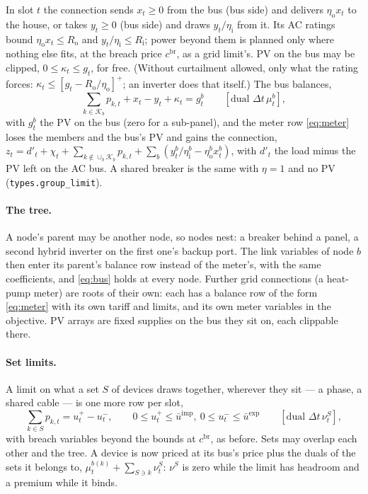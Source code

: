 \documentclass[11pt,a4paper]{article}
\newcommand{\dt}{\Delta t}
\newcommand{\cbr}{c^{\mathrm{br}}}
\begin{document}
In slot $t$ the connection sends $x_t \ge 0$ from the bus (bus side) and
delivers $\eta_{\mathrm o} x_t$ to the house, or takes $y_t \ge 0$ (bus side)
and draws $y_t/\eta_{\mathrm i}$ from it. Its AC ratings bound
$\eta_{\mathrm o} x_t \le R_{\mathrm o}$ and $y_t/\eta_{\mathrm i} \le R_{\mathrm i}$;
power beyond them is planned only where nothing else fits, at the breach price
$\cbr$, as a grid limit's. PV on the bus may be clipped, $0 \le \kappa_t \le g_t$,
for free. (Without curtailment allowed, only what the rating forces:
$\kappa_t \le [g_t - R_{\mathrm o}/\eta_{\mathrm o}]^+$; an inverter does that
itself.) The bus balances,
\begin{equation}
  \textstyle\sum_{k \in \mathcal K_b} p_{k,t} + x_t - y_t + \kappa_t = g^b_t
  \qquad [\text{dual } \dt\,\mu^b_t],
  \label{eq:bus}
\end{equation}
with $g^b_t$ the PV on the bus (zero for a sub-panel), and the meter row
\eqref{eq:meter} loses the members and the bus's PV and gains the connection,
$z_t = d'_t + \chi_t + \sum_{k \notin \cup_b \mathcal K_b} p_{k,t}
+ \sum_b (y^b_t/\eta^b_{\mathrm i} - \eta^b_{\mathrm o} x^b_t)$, with $d'_t$ the
load minus the PV left on the AC bus. A shared breaker is the same with
$\eta = 1$ and no PV (\texttt{types.group\_limit}).

\paragraph{The tree.} A node's parent may be another node, so nodes nest: a
breaker behind a panel, a second hybrid inverter on the first one's backup
port. The link variables of node $b$ then enter its parent's balance row
instead of the meter's, with the same coefficients, and \eqref{eq:bus} holds at
every node. Further grid connections (a heat-pump meter) are roots of their
own: each has a balance row of the form \eqref{eq:meter} with its own tariff
and limits, and its own meter variables in the objective. PV arrays are fixed
supplies on the bus they sit on, each clippable there.

\paragraph{Set limits.} A limit on what a set $S$ of devices draws together,
wherever they sit --- a phase, a shared cable --- is one more row per slot,
\[
  \textstyle\sum_{k \in S} p_{k,t} = u^+_t - u^-_t,\qquad 0 \le u^+_t \le \bar u^{\mathrm{imp}},\ 0 \le u^-_t \le \bar u^{\mathrm{exp}}
  \qquad [\text{dual } \dt\,\nu^S_t],
\]
with breach variables beyond the bounds at $\cbr$, as before. Sets may overlap
each other and the tree. A device is now priced at its bus's price plus the
duals of the sets it belongs to, $\mu^{b(k)}_t + \sum_{S \ni k} \nu^S_t$:
$\nu^S$ is zero while the limit has headroom and a premium while it binds.
\end{document}
